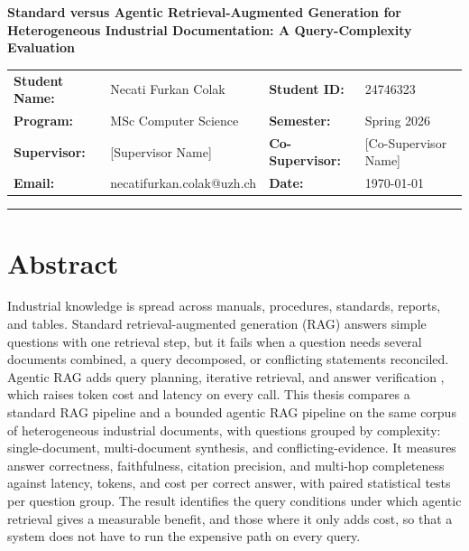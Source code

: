 \documentclass[10pt,a4paper]{article}
\begin{document}
\begin{center}
    {\Large \textbf{Standard versus Agentic Retrieval-Augmented Generation for\\[0.15em]Heterogeneous Industrial Documentation: A Query-Complexity Evaluation}}
\end{center}

\vspace{0.35em}

\noindent
\begin{tabularx}{\textwidth}{>{\bfseries}l X >{\bfseries}l X}
Student Name: & Necati Furkan Colak       & Student ID:     & 24746323 \\
Program:      & MSc Computer Science      & Semester:       & Spring 2026 \\
Supervisor:   & [Supervisor Name]         & Co-Supervisor:  & [Co-Supervisor Name] \\
Email:        & necatifurkan.colak@uzh.ch & Date:           & \today \\
\end{tabularx}

\vspace{0.5em}
\hrule
\vspace{0.5em}

\section{Abstract}

Industrial knowledge is spread across manuals, procedures, standards, reports, and tables. Standard retrieval-augmented generation (RAG) \cite{lewis2020rag} answers simple questions with one retrieval step, but it fails when a question needs several documents combined, a query decomposed, or conflicting statements reconciled. Agentic RAG adds query planning, iterative retrieval, and answer verification \cite{yao2023react, singh2025agentic}, which raises token cost and latency on every call. This thesis compares a standard RAG pipeline and a bounded agentic RAG pipeline on the same corpus of heterogeneous industrial documents, with questions grouped by complexity: single-document, multi-document synthesis, and conflicting-evidence. It measures answer correctness, faithfulness, citation precision, and multi-hop completeness against latency, tokens, and cost per correct answer, with paired statistical tests per question group. The result identifies the query conditions under which agentic retrieval gives a measurable benefit, and those where it only adds cost, so that a system does not have to run the expensive path on every query.
\end{document}
